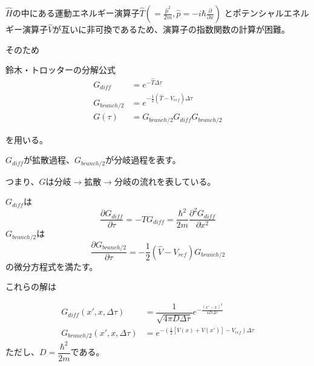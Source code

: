 \documentclass[dvipdfmx]{beamer}
\begin{document}
    \begin{frame}
        $\hat{H}$の中にある運動エネルギー演算子$\hat{T}(=\frac{\hat{p}^2}{2m},\hat{p} = -i\hbar\frac{\partial}{\partial x})$
        とポテンシャルエネルギー演算子$\hat{V}$が互いに非可換であるため、演算子の指数関数の計算が困難。

        そのため
        \begin{block}{鈴木・トロッターの分解公式}
            \begin{align}
                G_{diff} &= e^{-\hat{T}\Delta\tau} \\
                G_{branch/2} &= e^{-\frac{1}{2}(\hat{T} - V_{ref})\Delta\tau} \\
                G(\tau) &= G_{branch/2}G_{diff}G_{branch/2}
            \end{align}
        \end{block}
        を用いる。

        $G_{diff}$が拡散過程、$G_{branch/2}$が分岐過程を表す。

        つまり、$G$は分岐$\to$拡散$\to$分岐の流れを表している。
    \end{frame}

    \begin{frame}
        $G_{diff}$は
        \begin{equation}
            \dfrac{\partial G_{diff}}{\partial \tau} = - \hat{T}G_{diff} = \dfrac{\hbar^2}{2m}\dfrac{\partial^2 G_{diff}}{\partial x^2}
        \end{equation}
        $G_{branch/2}$は
        \begin{equation}
            \dfrac{\partial G_{branch/2}}{\partial \tau} = -\dfrac{1}{2}(\hat{V} - V_{ref})G_{branch/2}
        \end{equation}
        の微分方程式を満たす。

        これらの解は

        \begin{align}
            G_{diff}(x',x,\Delta\tau) &= \dfrac{1}{\sqrt{4\pi D\Delta\tau}}
            e^{-\frac{(x'-x)^2}{4D\Delta\tau}} \\
            G_{branch/2}(x',x,\Delta\tau) &= e^{-(\frac{1}{2}[V(x)+V(x')]-V_{ref})\Delta\tau}
        \end{align}
        ただし、$D=\dfrac{\hbar^2}{2m}$である。
    \end{frame}
\end{document}
